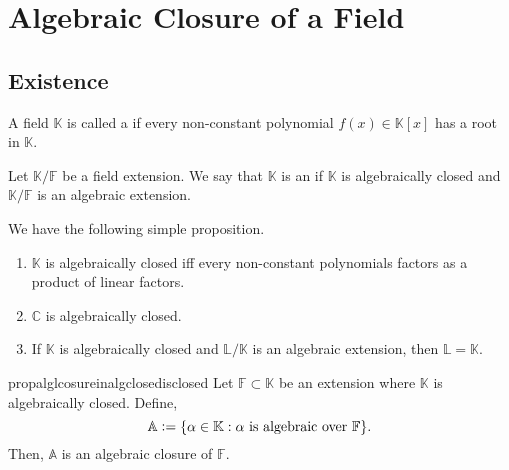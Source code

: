 \chapter{Algebraic Closure of a Field}

\section{Existence}

\begin{defn}%
    A field $\mathbb{K}$ is called a  if every non-constant polynomial $f(x) \in \mathbb{K}[x]$ has a root in $\mathbb{K}.$
\end{defn}

\begin{defn}%
    Let $\mathbb{K}/\mathbb{F}$ be a field extension. We say that $\mathbb{K}$ is an  if $\mathbb{K}$ is algebraically closed and $\mathbb{K}/\mathbb{F}$ is an algebraic extension.
\end{defn}

We have the following simple proposition.
\begin{prop}
    \phantom{hi}
    \begin{enumerate}
        \item $\mathbb{K}$ is algebraically closed iff every non-constant polynomials factors as a product of linear factors.
        \item $\mathbb{C}$ is algebraically closed.
        \item If $\mathbb{K}$ is algebraically closed and $\mathbb{L}/\mathbb{K}$ is an algebraic extension, then $\mathbb{L} = \mathbb{K}.$
    \end{enumerate}
\end{prop}

\begin{restatable}[]{prop}{alglcosureinalgclosedisclosed}
\label{prop:alglcosureinalgclosedisclosed}
    Let $\mathbb{F} \subset \mathbb{K}$ be an extension where $\mathbb{K}$ is algebraically closed. Define,
    \begin{equation*} 
        \mathbb{A} \vcentcolon= \{\alpha \in \mathbb{K} : \alpha \text{ is algebraic over }\mathbb{F}\}.
    \end{equation*}
    Then, $\mathbb{A}$ is an algebraic closure of $\mathbb{F}.$ \hfill\hyperref[prop:alglcosureinalgclosedisclosed2]{\downsym}
\end{restatable}

